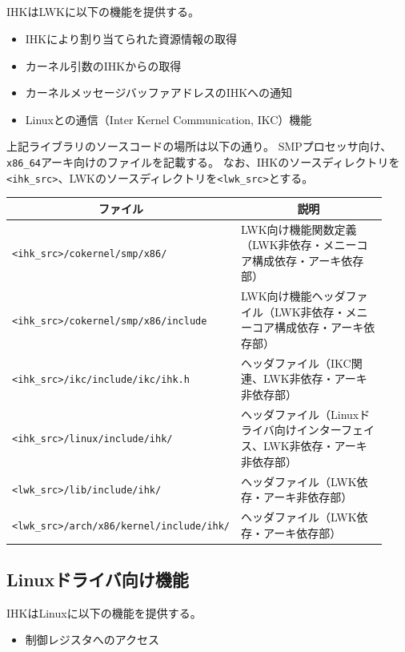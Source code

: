 \documentclass[twoside,11pt,fleqn]{book}
\begin{document}
\subsection{}
IHKはLWKに以下の機能を提供する。
\begin{itemize}
\item IHKにより割り当てられた資源情報の取得
\item カーネル引数のIHKからの取得
\item カーネルメッセージバッファアドレスのIHKへの通知
\item Linuxとの通信（Inter Kernel Communication, IKC）機能
\end{itemize}

上記ライブラリのソースコードの場所は以下の通り。
SMPプロセッサ向け、\texttt{x86\_64}アーキ向けのファイルを記載する。
なお、IHKのソースディレクトリを\texttt{<ihk\_src>}、LWKのソースディレクトリを\texttt{<lwk\_src>}とする。
\begin{table}[!h]
\footnotesize
\begin{tabular}{|p{0.43\linewidth}|p{0.50\linewidth}|} \hline
\multicolumn{1}{|c}{\textbf{ファイル}}&\multicolumn{1}{|c|}{\textbf{説明}}\\ \hline \hline
\texttt{<ihk\_src>/cokernel/smp/x86/}&LWK向け機能関数定義（LWK非依存・メニーコア構成依存・アーキ依存部）\\ \hline
\texttt{<ihk\_src>/cokernel/smp/x86/include}&LWK向け機能ヘッダファイル（LWK非依存・メニーコア構成依存・アーキ依存部）\\ \hline
\texttt{<ihk\_src>/ikc/include/ikc/ihk.h}&ヘッダファイル（IKC関連、LWK非依存・アーキ非依存部）\\ \hline
\texttt{<ihk\_src>/linux/include/ihk/}&ヘッダファイル（Linuxドライバ向けインターフェイス、LWK非依存・アーキ非依存部）\\ \hline
\texttt{<lwk\_src>/lib/include/ihk/}&ヘッダファイル（LWK依存・アーキ非依存部）\\ \hline
\texttt{<lwk\_src>/arch/x86/kernel/include/ihk/}&ヘッダファイル（LWK依存・アーキ依存部）\\ \hline
\end{tabular}
\vspace{-0em}
\end{table}
\FloatBarrier

\subsection{Linuxドライバ向け機能}
IHKはLinuxに以下の機能を提供する。
\begin{itemize}
\item 制御レジスタへのアクセス
\end{itemize}
\end{document}
